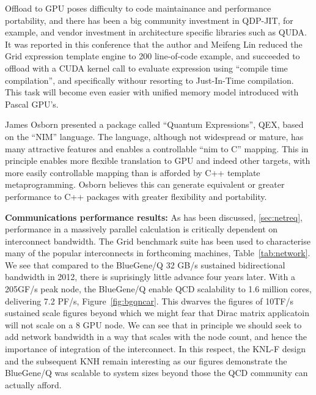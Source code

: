 \documentclass{PoS}
\begin{document}
Offload to GPU poses difficulty to  code maintainance and performance portability, and there
has been a big community investment in QDP-JIT, for example, and vendor investment in 
architecture specific libraries such as QUDA.
It was reported in this conference that the author and  Meifeng Lin reduced the Grid expression
template engine to 200 line-of-code example, and succeeded  to offload with a CUDA kernel call 
to evaluate expression using ``compile time compilation'', and specifically withour resorting to Just-In-Time
compilation. This task will become even easier with unified memory model introduced with Pascal GPU's.

James Osborn presented a package called ``Quantum Expressions'', QEX, based on the ``NIM'' language\cite{nim}.
The language, although not widespread or mature, has many attractive features and enables a controllable 
``nim to C'' mapping. This in principle enables more flexible translation to GPU and indeed other targets,
with more easily controllable mapping than is afforded by C++ template metaprogramming. Osborn believes this
can generate equivalent or greater performance to C++ packages with greater flexibility and portability.

{\bf Communications performance results:}
As has been discussed, \ref{sec:netreq}, performance in a massively parallel calculation is critically dependent
on interconnect bandwidth. The Grid benchmark suite has been used to characterise many of the popular interconnects
in forthcoming machines, Table~\ref{tab:network}. 
We see that compared to the BlueGene/Q 32 GB/s sustained bidirectional
bandwidth in 2012, there is suprisingly little advance four years later\cite{boylebgq}. With a 205GF/s peak
node, the BlueGene/Q enable QCD scalability to 1.6 million cores, delivering 7.2 PF/s, Figure~\ref{fig:bgqncar}. 
This dwarves the figures
of 10TF/s sustained scale figures beyond which we might fear that Dirac matrix applicatoin will not
scale on a 8 GPU node. We can see that in principle we should seek to add network bandwidth in a way that
scales with the node count, and hence the importance of integration of the interconnect.
In this respect, the KNL-F design and the subsequent KNH remain interesting as our
figures demonstrate the BlueGene/Q was scalable to system sizes beyond those the QCD community can actually afford.
\end{document}

